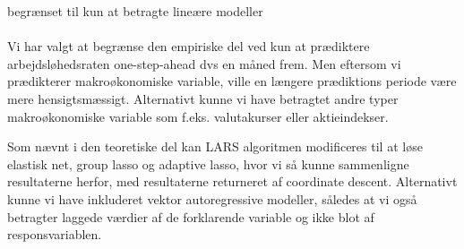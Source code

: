 begrænset til kun at betragte lineære modeller

\paragraph{}
Vi har valgt at begrænse den empiriske del ved kun at prædiktere arbejdsløhedsraten one-step-ahead dvs en måned frem.
Men eftersom vi prædikterer makroøkonomiske variable, ville en længere prædiktions periode være mere hensigtsmæssigt.
Alternativt kunne vi have betragtet andre typer makroøkonomiske variable som f.eks. valutakurser eller aktieindekser.

Som nævnt i den teoretiske del kan LARS algoritmen modificeres til at løse elastisk net, group lasso og adaptive lasso, hvor vi så kunne sammenligne resultaterne herfor, med resultaterne returneret af coordinate descent.
Alternativt kunne vi have inkluderet vektor autoregressive modeller, således at vi også betragter laggede værdier af de forklarende variable og ikke blot af responsvariablen.
